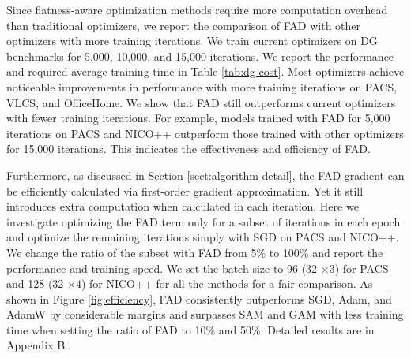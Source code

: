Since flatness-aware optimization methods require more computation overhead than traditional optimizers, we report the comparison of FAD with other optimizers with more training iterations. We train current optimizers on DG benchmarks for 5,000, 10,000, and 15,000 iterations. We report the performance and required average training time in Table \ref{tab:dg-cost}. Most optimizers achieve noticeable improvements in performance with more training iterations on PACS, VLCS, and OfficeHome. We show that FAD still outperforms current optimizers with fewer training iterations. For example, models trained with FAD for 5,000 iterations on PACS and NICO++ outperform those trained with other optimizers for 15,000 iterations.
This indicates the effectiveness and efficiency of FAD. 



Furthermore, as discussed in Section \ref{sect:algorithm-detail}, the FAD gradient can be efficiently calculated via first-order gradient approximation. Yet it still introduces extra computation when calculated in each iteration. Here we investigate optimizing the FAD term only for a subset of iterations in each epoch and optimize the remaining iterations simply with SGD on PACS and NICO++. We change the ratio of the subset with FAD from 5\% to 100\% and report the performance and training speed. We set the batch size to 96 (32 $\times 3$) for PACS and 128 (32 $\times 4$) for NICO++ for all the methods for a fair comparison. As shown in Figure \ref{fig:efficiency}, FAD consistently outperforms SGD, Adam, and AdamW by considerable margins and surpasses SAM and GAM with less training time when setting the ratio of FAD to 10\% and 50\%. Detailed results are in Appendix B.


